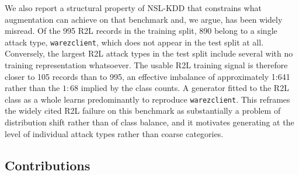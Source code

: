 \documentclass[11pt]{article}
\newcommand{\rtwolTrain}{995}
\newcommand{\warezTrain}{890}
\newcommand{\rtwolEffective}{105}
\newcommand{\rtwolEffectiveRatio}{1{:}641}
\begin{document}
We also report a structural property of NSL-KDD that constrains what
augmentation can achieve on that benchmark and, we argue, has been widely
misread. Of the \rtwolTrain{} R2L records in the training split, \warezTrain{}
belong to a single attack type, \texttt{warezclient}, which does not appear in
the test split at all. Conversely, the largest R2L attack types in the test
split include several with no training representation whatsoever. The usable R2L
training signal is therefore closer to \rtwolEffective{} records than to
\rtwolTrain{}, an effective imbalance of approximately
\rtwolEffectiveRatio{} rather than the \(1{:}68\) implied by the class counts. A
generator fitted to the R2L class as a whole learns predominantly to reproduce
\texttt{warezclient}. This reframes the widely cited R2L failure on this
benchmark as substantially a problem of distribution shift rather than of class
balance, and it motivates generating at the level of individual attack types
rather than coarse categories.

\subsection*{Contributions}
\end{document}
